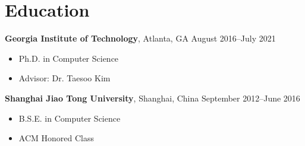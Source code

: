 \section*{Education}

\begin{description}
\item {\bf Georgia Institute of Technology}, Atlanta, GA \dotfill August 2016--July 2021
  \begin{itemize}
  \item Ph.D. in Computer Science
  \item Advisor: Dr. Taesoo Kim
  \end{itemize}
  
\item {\bf Shanghai Jiao Tong University}, Shanghai, China \dotfill September 2012--June 2016
  \begin{itemize}
  \item B.S.E. in Computer Science
  \item ACM Honored Class
  \end{itemize}

\end{description}
